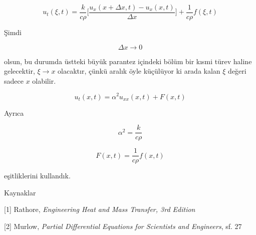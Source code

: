 \documentclass[12pt,fleqn]{article}\usepackage{../../common}
\begin{document}
$$
u_t(\xi,t) =  \frac{k}{c\rho}
\bigg[
\frac{u_x(x+\Delta x,t) - u_x(x,t)} {\Delta x}
\bigg]
+ \frac{ 1}{c\rho}f(\xi,t)
$$

Şimdi 

$$ \Delta x \to 0 $$

olsun, bu durumda üstteki büyük parantez içindeki bölüm bir kısmi türev
haline gelecektir, $\xi \to x$ olacaktır, çünkü aralık öyle küçülüyor ki
arada kalan $\xi$ değeri sadece $x$ olabilir.

$$ u_t(x,t) = \alpha^2u_{xx}(x,t) + F(x,t) $$

Ayrıca

$$ \alpha^2 = \frac{k}{c\rho} $$

$$ F(x,t) = \frac{1}{c\rho}f(x,t) $$

eşitliklerini kullandık.



Kaynaklar

[1] Rathore, {\em Engineering Heat and Mass Transfer, 3rd Edition}

[2] Murlow, {\em Partial Differential Equations for Scientists and Engineers}, sf. 27
\end{document}
